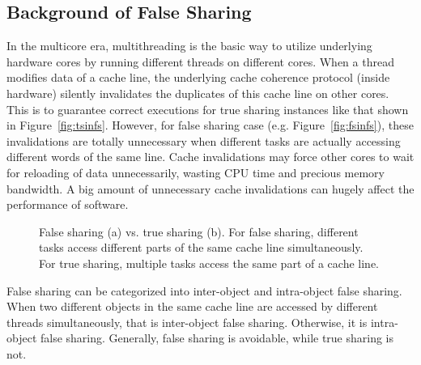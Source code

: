 \label{sec:overview}

\subsection{Background of False Sharing}
\label{sec:background}

In the multicore era, multithreading is the basic way to utilize underlying hardware cores by running different threads on different cores. When a thread modifies data of a cache line, the underlying cache coherence protocol (inside hardware) silently invalidates the duplicates of this cache line on other cores. This is to guarantee correct executions for true sharing instances like that shown in Figure~\ref{fig:tsinfs}. However, for false sharing case (e.g. Figure~\ref{fig:fsinfs}), these invalidations are totally unnecessary when different tasks are actually accessing different words of the same line. Cache invalidations may force other cores to wait for reloading of data unnecessarily, wasting CPU time and precious memory bandwidth. A big amount of unnecessary cache invalidations can hugely affect the performance of software. %

\begin{figure}[htbp]
\centering
{}%
\hspace{30pt}
%
\caption{False sharing (a) vs. true sharing (b). For false sharing, different tasks access different parts of the same cache line simultaneously. For true sharing, multiple tasks access the same part of a cache line.\label{fig:falsesharing}}
\end{figure}

False sharing can be categorized into inter-object and intra-object false sharing. When two different objects in the same cache line are accessed by different threads simultaneously, that is inter-object false sharing. Otherwise, it is intra-object false sharing. Generally, false sharing is avoidable, while true sharing is not. 

